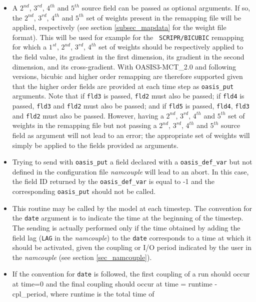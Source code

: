 \begin{itemize}

\item A $2^{nd}$, $3^{rd}$, $4^{th}$ and $5^{th}$ source field can be
  passed as optional arguments. If so, the $2^{nd}$, $3^{rd}$,
  $4^{th}$ and $5^{th}$ set of weights present in the remapping file
  will be applied, respectively (see section \ref{subsec_mapdata} for
  the weight file format). This will be used for example for the {\tt
    SCRIPR/BICUBIC} remapping for which a $1^{st}$, $2^{nd}$,
  $3^{rd}$, $4^{th}$ set of weights should be respectively applied to
  the field value, its gradient in the first dimension, its gradient
  in the second dimension, and its cross-gradient. With
  OASIS3-MCT\_2.0 and following versions, bicubic and higher order
  remapping are therefore supported given that the higher order fields
  are provided at each time step as {\tt oasis\_put} arguments. Note
  that if {\tt fld3} is passed, {\tt fld2} must also be passed; if
  {\tt fld4} is passed, {\tt fld3} and {\tt fld2} must also be passed;
  and if {\tt fld5} is passed, {\tt fld4}, {\tt fld3} and {\tt fld2}
  must also be passed. However, having a $2^{nd}$, $3^{rd}$, $4^{th}$
  and $5^{th}$ set of weights in the remapping file but not passing a
  $2^{nd}$, $3^{rd}$, $4^{th}$ and $5^{th}$ source field as argument
  will not lead to an error; the appropriate set of weights will
  simply be applied to the fields provided as arguments.
\item Trying to send with {\tt oasis\_put} a field declared with a
  {\tt oasis\_def\_var} but not defined in the configuration file {\it
    namcouple} will lead to an abort. In this case, the field ID
  returned by the {\tt oasis\_def\_var} is equal to -1 and the
  corresponding {\tt oasis\_put} should not be called.
\item This routine may be called by the model at each timestep. The
  convention for the {\tt date} argument is to indicate the time at
  the beginning of the timestep. The sending is actually performed
  only if the time obtained by adding the field lag ({\tt LAG} in the
  {\em namcouple}) to the {\tt date} corresponds to a time at which it
  should be activated, given the coupling or I/O period indicated by
  the user in the {\it namcouple} (see section \ref{sec_namcouple}).
\item If the convention for {\tt date} is followed, the first coupling
  of a run should occur at time=0 and the final coupling should occur
  at time = runtime - cpl\_period, where runtime is the total time of

\end{itemize}
